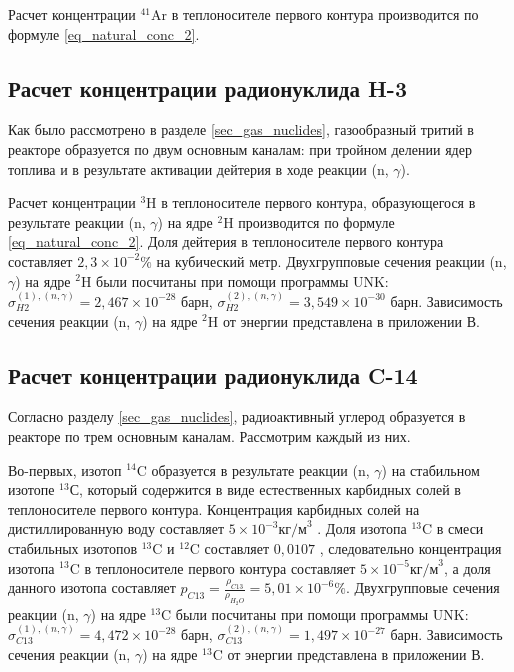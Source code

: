 Расчет концентрации $^{41}\text{Ar}$ в теплоносителе первого контура производится по формуле \ref{eq_natural_conc_2}.

\subsection{Расчет концентрации радионуклида H-3}

Как было рассмотрено в разделе \ref{sec_gas_nuclides}, газообразный тритий в реакторе образуется по двум основным 
каналам: при тройном делении ядер топлива и в результате активации дейтерия в ходе реакции (n, $\gamma$). 

Расчет концентрации $^{3}\text{H}$ в теплоносителе первого контура, образующегося в результате реакции (n, $\gamma$) на 
ядре $^{2}\text{H}$ производится по формуле \ref{eq_natural_conc_2}. Доля дейтерия в теплоносителе первого контура 
составляет $2,3 \times 10^{-2} \%$ на кубический метр. Двухгрупповые сечения реакции (n, $\gamma$) на ядре 
$^{2}\text{H}$ были посчитаны при помощи программы UNK: 
$\sigma_{H2}^{(1), (n, \gamma)} = 2,467 \times 10^{-28}$ барн, 
$\sigma_{H2}^{(2), (n, \gamma)} = 3,549 \times 10^{-30}$ барн. 
Зависимость сечения реакции (n, $\gamma$) на ядре $^{2}\text{H}$ от энергии представлена в приложении В.

\subsection{Расчет концентрации радионуклида C-14}

Согласно разделу \ref{sec_gas_nuclides}, радиоактивный углерод образуется в реакторе по трем основным каналам. 
Рассмотрим каждый из них.

Во-первых, изотоп $^{14}\text{C}$ образуется в результате реакции (n, $\gamma$) на стабильном изотопе $^{13}\text{С}$, 
который содержится в виде естественных карбидных солей в теплоносителе первого контура. Концентрация карбидных солей на 
дистиллированную воду составляет $5 \times 10^{-3} \text{кг/м}^{3}$ \cite{gost_water}. Доля изотопа $^{13}\text{C}$ в 
смеси стабильных изотопов $^{13}\text{C}$ и $^{12}\text{C}$ составляет $0,0107$ \cite{audi_carbid_sald}, следовательно 
концентрация изотопа $^{13}\text{C}$ в теплоносителе первого контура составляет $5 \times 10^{-5} \text{кг/м}^{3}$, а 
доля данного изотопа составляет $p_{C13} = \frac{\rho_{C13}}{\rho_{H_{2}O}} = 5,01 \times 10^{-6} \%$. Двухгрупповые 
сечения реакции (n, $\gamma$) на ядре $^{13}\text{C}$ были посчитаны при помощи программы UNK:
$\sigma_{C13}^{(1), (n, \gamma)} = 4,472 \times 10^{-28}$ барн, 
$\sigma_{C13}^{(2), (n, \gamma)} = 1,497 \times 10^{-27}$ барн.
Зависимость сечения реакции (n, $\gamma$) на ядре $^{13}\text{C}$ от энергии представлена в приложении В. 

